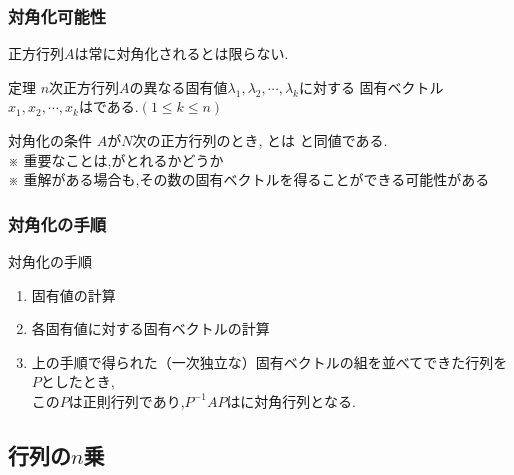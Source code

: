 \documentclass[a4paper]{jsarticle}
\begin{document}
\subsubsection{対角化可能性}
正方行列$A$は常に対角化されるとは限らない.
\begin{itembox}[l]{定理}
    $n$次正方行列$A$の異なる固有値$\lambda_1,\lambda_2,\cdots,\lambda_k$に対する
    固有ベクトル$x_1,x_2,\cdots,x_k$はである.$\left(1\leq k\leq n\right)$
\end{itembox}
\begin{itembox}[l]{対角化の条件}
    $A$が$N$次の正方行列のとき, とは
    と同値である.\\
    ※ 重要なことは,がとれるかどうか\\
    ※ 重解がある場合も,その数の固有ベクトルを得ることができる可能性がある
\end{itembox}
\subsubsection{対角化の手順}
\begin{itembox}[l]{対角化の手順}
    \begin{enumerate}[(1)]
        \item 固有値の計算
        \item 各固有値に対する固有ベクトルの計算
        \item 上の手順で得られた（一次独立な）固有ベクトルの組を並べてできた行列を$P$としたとき,\\
              この$P$は正則行列であり,$P^{-1}AP$はに対角行列となる.
    \end{enumerate}
\end{itembox}
\subsection{行列の$n$乗}
\end{document}
